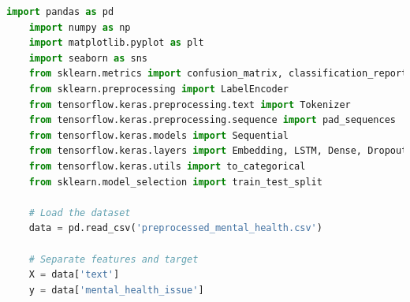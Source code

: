 \begin{tcolorbox}[colback=gray!5!white, colframe=gray!80!black, boxrule=0.5pt, title=LSTM Model Implementation]
    \begin{lstlisting}[language=Python]
    import pandas as pd
    import numpy as np
    import matplotlib.pyplot as plt
    import seaborn as sns
    from sklearn.metrics import confusion_matrix, classification_report
    from sklearn.preprocessing import LabelEncoder
    from tensorflow.keras.preprocessing.text import Tokenizer
    from tensorflow.keras.preprocessing.sequence import pad_sequences
    from tensorflow.keras.models import Sequential
    from tensorflow.keras.layers import Embedding, LSTM, Dense, Dropout
    from tensorflow.keras.utils import to_categorical
    from sklearn.model_selection import train_test_split

    # Load the dataset
    data = pd.read_csv('preprocessed_mental_health.csv')

    # Separate features and target
    X = data['text']
    y = data['mental_health_issue']

\end{lstlisting}
\end{tcolorbox}

